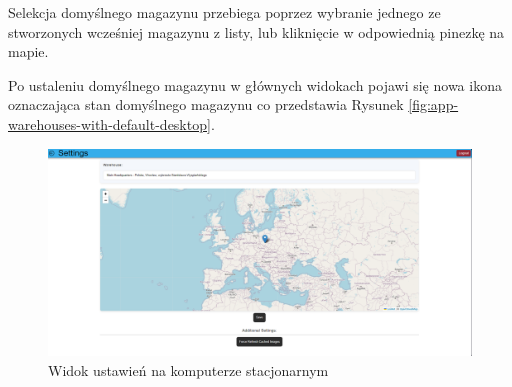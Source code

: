 \documentclass[../main.tex]{subfiles}
\begin{document}
            Selekcja domyślnego magazynu przebiega poprzez wybranie jednego ze stworzonych wcześniej magazynu z listy, lub kliknięcie w odpowiednią pinezkę na mapie.

            Po ustaleniu domyślnego magazynu w głównych widokach pojawi się nowa ikona oznaczająca stan domyślnego magazynu co przedstawia Rysunek \ref{fig:app-warehouses-with-default-desktop}.

            \begin{figure}[H]
                \centering
                \includegraphics[width=\getImageWidth]{images/app-desktop/app-settings-desktop.png}
                \caption{Widok ustawień na komputerze stacjonarnym}
                \label{fig:app-settings-desktop}
            \end{figure}
            
\end{document}
